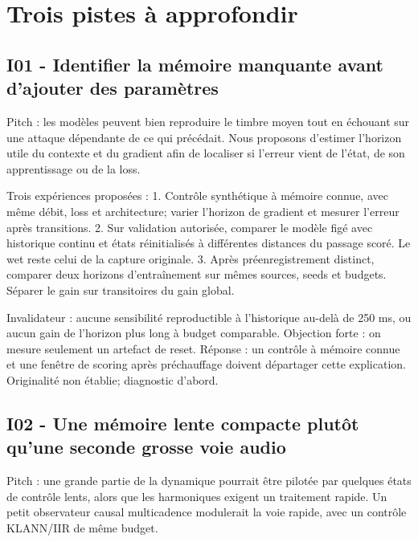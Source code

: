 \documentclass[10pt,a4paper]{article}
\begin{document}
\section{Trois pistes \`{a} approfondir}

\subsection{I01 - Identifier la m\'{e}moire manquante avant d'ajouter des param\`{e}tres}

Pitch : les mod\`{e}les peuvent bien reproduire le timbre moyen tout en \'{e}chouant sur une
attaque d\'{e}pendante de ce qui pr\'{e}c\'{e}dait. Nous proposons d'estimer l'horizon utile du contexte
et du gradient afin de localiser si l'erreur vient de l'\'{e}tat, de son apprentissage ou de la loss.

Trois exp\'{e}riences propos\'{e}es :
1. Contr\^{o}le synth\'{e}tique \`{a} m\'{e}moire connue, avec m\^{e}me d\'{e}bit, loss et architecture; varier
   l'horizon de gradient et mesurer l'erreur apr\`{e}s transitions.
2. Sur validation autoris\'{e}e, comparer le mod\`{e}le fig\'{e} avec historique continu et \'{e}tats r\'{e}initialis\'{e}s
   \`{a} diff\'{e}rentes distances du passage scor\'{e}. Le wet reste celui de la capture originale.
3. Apr\`{e}s pr\'{e}enregistrement distinct, comparer deux horizons d'entra\^{i}nement sur m\^{e}mes sources,
   seeds et budgets. S\'{e}parer le gain sur transitoires du gain global.

Invalidateur : aucune sensibilit\'{e} reproductible \`{a} l'historique au-del\`{a} de 250 ms, ou aucun gain
de l'horizon plus long \`{a} budget comparable. Objection forte : on mesure seulement un artefact de
reset. R\'{e}ponse : un contr\^{o}le \`{a} m\'{e}moire connue et une fen\^{e}tre de scoring apr\`{e}s pr\'{e}chauffage
doivent d\'{e}partager cette explication. Originalit\'{e} non \'{e}tablie; diagnostic d'abord.

\subsection{I02 - Une m\'{e}moire lente compacte plut\^{o}t qu'une seconde grosse voie audio}

Pitch : une grande partie de la dynamique pourrait \^{e}tre pilot\'{e}e par quelques \'{e}tats de contr\^{o}le
lents, alors que les harmoniques exigent un traitement rapide. Un petit observateur causal
multicadence modulerait la voie rapide, avec un contr\^{o}le KLANN/IIR de m\^{e}me budget.
\end{document}
